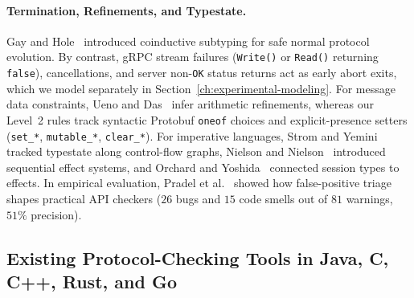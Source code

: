 \paragraph{Termination, Refinements, and Typestate.}
Gay and Hole~\cite{gay-hole-2005} introduced coinductive subtyping for safe normal protocol evolution. By contrast, gRPC stream failures (\texttt{Write()} or \texttt{Read()} returning \texttt{false}), cancellations, and server non-\texttt{OK} status returns act as early abort exits, which we model separately in Section~\ref{ch:experimental-modeling}. For message data constraints, Ueno and Das~\cite{ueno-das-2026} infer arithmetic refinements, whereas our Level~2 rules track syntactic Protobuf \texttt{oneof} choices and explicit-presence setters (\texttt{set\_*}, \texttt{mutable\_*}, \texttt{clear\_*}). For imperative languages, Strom and Yemini~\cite{strom-yemini-1986} tracked typestate along control-flow graphs, Nielson and Nielson~\cite{nielson-nielson-1999} introduced sequential effect systems, and Orchard and Yoshida~\cite{orchard-yoshida-2016} connected session types to effects. In empirical evaluation, Pradel et al.~\cite{pradel-et-al-2012} showed how false-positive triage shapes practical API checkers ($26$ bugs and $15$ code smells out of $81$ warnings, $51\%$ precision).

\subsection{Existing Protocol-Checking Tools in Java, C, C++, Rust, and Go}
\label{sec:rw-systems}

